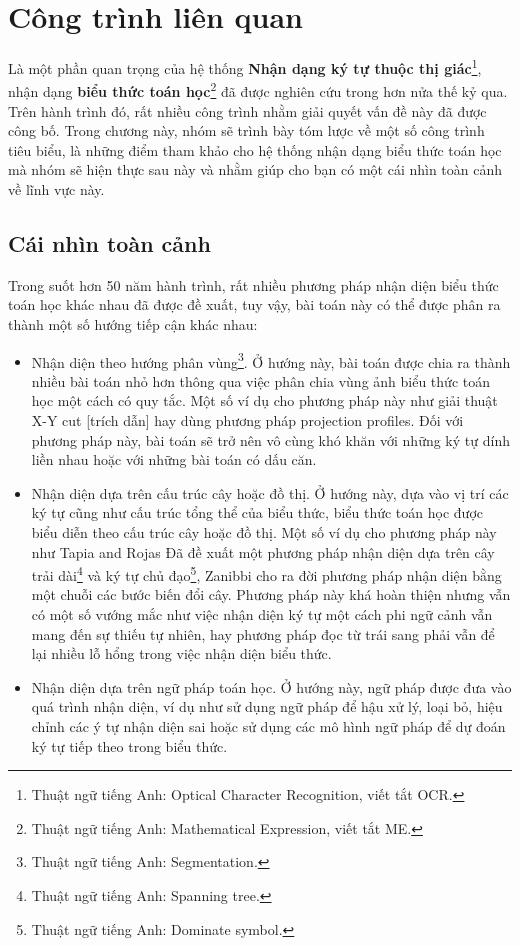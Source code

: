 \documentclass[a4paper,12pt]{article}
\begin{document}
	
	
	\newpage
	\section{Công trình liên quan}
	Là một phần quan trọng của hệ thống \textbf{Nhận dạng ký tự thuộc thị giác}\footnote{Thuật ngữ tiếng Anh: Optical Character Recognition, viết tắt OCR.}, nhận dạng \textbf{biểu thức toán học}\footnote{Thuật ngữ tiếng Anh: Mathematical Expression, viết tắt ME.} đã được nghiên cứu trong hơn nửa thế kỷ qua. Trên hành trình đó, rất nhiều công trình nhằm giải quyết vấn đề này đã được công bố. Trong chương này, nhóm sẽ trình bày tóm lược về một số công trình tiêu biểu, là những điểm tham khảo cho hệ thống nhận dạng biểu thức toán học mà nhóm sẽ hiện thực sau này và nhằm giúp cho bạn có một cái nhìn toàn cảnh về lĩnh vực này.
	\subsection{Cái nhìn toàn cảnh}
	
	Trong suốt hơn 50 năm hành trình, rất nhiều phương pháp nhận diện biểu thức toán học khác nhau đã được đề xuất, tuy vậy, bài toán này có thể được phân ra thành một số hướng tiếp cận khác nhau:
	
	\begin{itemize}
		\item Nhận diện theo hướng phân vùng\footnote{Thuật ngữ tiếng Anh: Segmentation.}. Ở hướng này, bài toán được chia ra thành nhiều bài toán nhỏ hơn thông qua việc phân chia vùng ảnh biểu thức toán học một cách có quy tắc. Một số ví dụ cho phương pháp này như giải thuật X-Y cut [trích dẫn] hay dùng phương pháp projection profiles. Đối với phương pháp này, bài toán sẽ trở nên vô cùng khó khăn với những ký tự dính liền nhau hoặc với những bài toán có dấu căn.
		
		\item Nhận diện dựa trên cấu trúc cây hoặc đồ thị. Ở hướng này, dựa vào vị trí các ký tự cũng như cấu trúc tổng thể của biểu thức, biểu thức toán học được biểu diễn theo cấu trúc cây hoặc đồ thị. Một số ví dụ cho phương pháp này như Tapia and Rojas Đã đề xuất một phương pháp nhận diện dựa trên cây trải dài\footnote{Thuật ngữ tiếng Anh: Spanning tree.} và ký tự chủ đạo\footnote{Thuật ngữ tiếng Anh: Dominate symbol.}, Zanibbi cho ra đời phương pháp nhận diện bằng một chuỗi các bước biến đổi cây. Phương pháp này khá hoàn thiện nhưng vẫn có một số vướng mắc như việc nhận diện ký tự một cách phi ngữ cảnh vẫn mang đến sự thiếu tự nhiên, hay phương pháp đọc từ trái sang phải vẫn để lại nhiều lỗ hổng trong việc nhận diện biểu thức.
		
		\item Nhận diện dựa trên ngữ pháp toán học. Ở hướng này, ngữ pháp được đưa vào quá trình nhận diện, ví dụ như sử dụng ngữ pháp để hậu xử lý, loại bỏ, hiệu chỉnh các ý tự nhận diện sai hoặc sử dụng các mô hình ngữ pháp để dự đoán ký tự tiếp theo trong biểu thức.
	\end{itemize}
	
\end{document}
